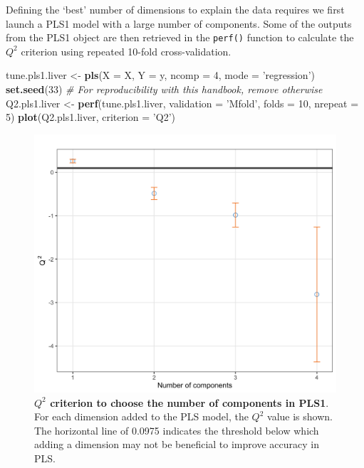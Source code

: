 \documentclass[]{book}
\newenvironment{Shaded}{\begin{snugshade}}{\end{snugshade}}
\newcommand{\CommentTok}[1]{\textcolor[rgb]{0.56,0.35,0.01}{\textit{#1}}}
\newcommand{\DataTypeTok}[1]{\textcolor[rgb]{0.13,0.29,0.53}{#1}}
\newcommand{\DecValTok}[1]{\textcolor[rgb]{0.00,0.00,0.81}{#1}}
\newcommand{\KeywordTok}[1]{\textcolor[rgb]{0.13,0.29,0.53}{\textbf{#1}}}
\newcommand{\NormalTok}[1]{#1}
\newcommand{\StringTok}[1]{\textcolor[rgb]{0.31,0.60,0.02}{#1}}
\begin{document}
Defining the `best' number of dimensions to explain the data requires we first launch a PLS1 model with a large number of components. Some of the outputs from the PLS1 object are then retrieved in the \texttt{perf()} function to calculate the \(Q^2\) criterion using repeated 10-fold cross-validation.

\begin{Shaded}
\begin{Highlighting}[]
\NormalTok{tune.pls1.liver <-}\StringTok{ }\KeywordTok{pls}\NormalTok{(}\DataTypeTok{X =}\NormalTok{ X, }\DataTypeTok{Y =}\NormalTok{ y, }\DataTypeTok{ncomp =} \DecValTok{4}\NormalTok{, }\DataTypeTok{mode =} \StringTok{'regression'}\NormalTok{)}
\KeywordTok{set.seed}\NormalTok{(}\DecValTok{33}\NormalTok{)  }\CommentTok{# For reproducibility with this handbook, remove otherwise}
\NormalTok{Q2.pls1.liver <-}\StringTok{ }\KeywordTok{perf}\NormalTok{(tune.pls1.liver, }\DataTypeTok{validation =} \StringTok{'Mfold'}\NormalTok{, }
                      \DataTypeTok{folds =} \DecValTok{10}\NormalTok{, }\DataTypeTok{nrepeat =} \DecValTok{5}\NormalTok{)}
\KeywordTok{plot}\NormalTok{(Q2.pls1.liver, }\DataTypeTok{criterion =} \StringTok{'Q2'}\NormalTok{)}
\end{Highlighting}
\end{Shaded}

\begin{figure}

{\centering \includegraphics[width=0.5\linewidth]{Figures/PLS/pls1-Q2-1} 

}

\caption{\textbf{\(Q^2\) criterion to choose the number of components in PLS1}. For each dimension added to the PLS model, the \(Q^2\) value is shown. The horizontal line of 0.0975 indicates the threshold below which adding a dimension may not be beneficial to improve accuracy in PLS.}\label{fig:pls1-Q2}
\end{figure}
\end{document}
